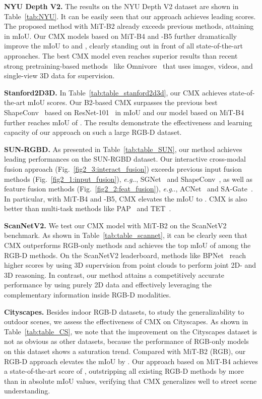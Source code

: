 \documentclass[journal]{IEEEtran}
\makeatletter
\DeclareRobustCommand\onedot{\futurelet\@let@token\@onedot}
\def\@onedot{\ifx\@let@token.\else.\null\fi\xspace}
\def\eg{\emph{e.g}\onedot} \def\Eg{\emph{E.g}\onedot}
\makeatother
\begin{document}
\noindent\textbf{NYU Depth V2.}
The results on the NYU Depth V2 dataset are shown in Table~\ref{tab:NYU}. It can be easily seen that our approach achieves leading scores.
The proposed method with MiT-B2 already exceeds previous methods, attaining  in mIoU.
{Our CMX models based on MiT-B4 and -B5 further dramatically improve the mIoU to  and , clearly standing out in front of all state-of-the-art approaches.}
The best CMX model even reaches superior results than recent strong pretraining-based methods~\cite{girdhar2022omnivore,bachmann2022multimae} like Omnivore~\cite{girdhar2022omnivore} that uses images, videos, and single-view 3D data for supervision.

\noindent\textbf{Stanford2D3D.} {In Table~\ref{tab:table_stanford2d3d}, our CMX achieves state-of-the-art mIoU scores. Our B2-based CMX surpasses the previous best ShapeConv~\cite{cao2021shapeconv} based on ResNet-101~\cite{he2016resnet} in mIoU} and our model based on MiT-B4 further reaches mIoU of . The results demonstrate the effectiveness and learning capacity of our approach on such a large RGB-D dataset.

\noindent\textbf{SUN-RGBD.} 
As presented in Table~\ref{tab:table_SUN}, our method achieves leading performances on the SUN-RGBD dataset. Our interactive cross-modal fusion approach (Fig.~\ref{fig2_3:interact_fusion}) exceeds previous input fusion methods (Fig.~\ref{fig2_1:input_fusion}), \eg, SGNet~\cite{chen2021spatial_guided} and ShapeConv~\cite{cao2021shapeconv}, as well as feature fusion methods (Fig.~\ref{fig2_2:feat_fusion}), \eg, ACNet~\cite{hu2019acnet} and SA-Gate~\cite{chen2020sa_gate}.
In particular, with MiT-B4 and -B5, CMX elevates the mIoU to .
CMX is also better than multi-task methods like PAP~\cite{zhang2019pattern} and TET~\cite{zhang2022tube_embedded}.

\noindent\textbf{ScanNetV2.}
We test our CMX model with MiT-B2 on the ScanNetV2 benchmark.
As shown in Table~\ref{tab:table_scannet}, it can be clearly seen that CMX outperforms RGB-only methods and achieves the top mIoU of  among the RGB-D methods.
On the ScanNetV2 leaderboard, methods like BPNet~\cite{hu2021bidirectional_projection} reach higher scores by using 3D supervision from point clouds to perform joint 2D- and 3D reasoning. In contrast, our method attains a competitively accurate performance by using purely 2D data and effectively leveraging the complementary information inside RGB-D modalities.

\noindent\textbf{Cityscapes.}
Besides indoor RGB-D datasets, to study the generalizability to outdoor scenes, we assess the effectiveness of CMX on Cityscapes. 
As shown in Table~\ref{tab:table_CS}, we note that the improvement on the Cityscapes dataset is not as obvious as other datasets, because the performance of RGB-only models on this dataset shows a saturation trend.
Compared with MiT-B2 (RGB), our RGB-D approach elevates the mIoU by .
Our approach based on MiT-B4 achieves a state-of-the-art score of , outstripping all existing RGB-D methods by more than  in absolute mIoU values, verifying that CMX generalizes well to street scene understanding.
\end{document}
